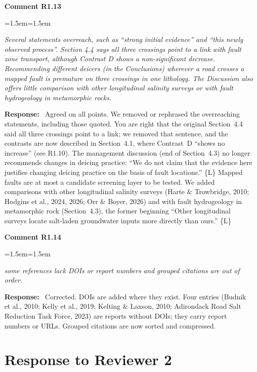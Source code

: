 \documentclass[11pt]{article}
\newcommand{\reviewer}[1]{\section*{Response to Reviewer #1}}
\newenvironment{comment}[1]
  {\par\medskip\noindent\textbf{Comment #1}\par
   \begin{list}{}{\leftmargin=1.5em\rightmargin=1.5em}\item\color{commentcolor}\itshape}
  {\end{list}}
\newenvironment{response}
  {\par\noindent\textbf{Response:}\ }
  {\par}
\newcommand{\Ln}[1]{\{L\Lref{L:#1}\}}
\newcommand{\mq}[1]{``#1''}
\begin{document}
\begin{comment}{R1.13}
Several statements overreach, such as ``strong initial evidence'' and ``this newly
observed process''. Section 4.4 says all three crossings point to a link with fault zone
transport, although Contrast D shows a non-significant decrease. Recommending different
deicers (in the Conclusions) wherever a road crosses a mapped fault is premature on three
crossings in one lithology. The Discussion also offers little comparison with other
longitudinal salinity surveys or with fault hydrogeology in metamorphic rocks.
\end{comment}
\begin{response}
Agreed on all points. We removed or rephrased the overreaching statements, including those
quoted. You are right that the original Section~4.4 said all three crossings point to a link;
we removed that sentence, and the contrasts are now described in Section~4.1, where Contrast~D
\mq{shows no increase} (see R1.10). The management discussion (end of Section~4.3) no longer
recommends changes in deicing practice: \mq{We do not claim that the evidence here justifies changing deicing
practice on the basis of fault locations.} \Ln{mgmt} Mapped faults are at most a
candidate screening layer to be tested. We added comparisons with other longitudinal salinity
surveys (Harte \& Trowbridge, 2010; Hodgins et al., 2024, 2026; Orr \& Boyer, 2026) and with
fault hydrogeology in metamorphic rock (Section~4.3), the former beginning
\mq{Other longitudinal surveys locate salt-laden groundwater inputs more directly than ours.}
\Ln{disc-surveys}
\end{response}

\begin{comment}{R1.14}
some references lack DOIs or report numbers and grouped citations are out of order.
\end{comment}
\begin{response}
Corrected. DOIs are added where they exist. Four entries (Budnik et al., 2010; Kelly et al.,
2019; Kelting \& Laxson, 2010; Adirondack Road Salt Reduction Task Force, 2023) are reports
without DOIs; they carry report numbers or URLs. Grouped citations are now sorted and
compressed.
\end{response}

\reviewer{2}
\end{document}
